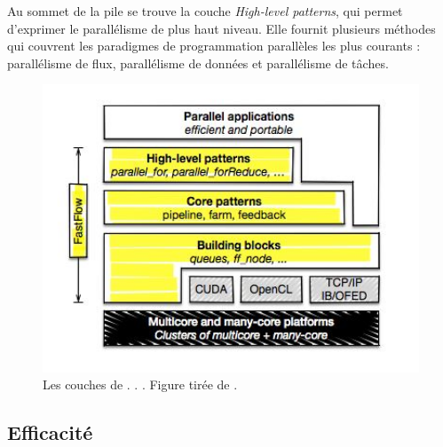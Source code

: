 Au sommet de la pile se trouve la couche \emph{High-level patterns}, qui permet d'exprimer le parall\'elisme de plus haut niveau. Elle fournit plusieurs m\'ethodes qui couvrent les paradigmes de programmation parall\`eles les plus courants : parall\'elisme de flux, parall\'elisme de donn\'ees et  parall\'elisme de t\^aches. 

\begin{figure}[ht]
\centering
     \includegraphics[width=1.0\textwidth]{Figures/FastFlowLayers.jpg}
      \caption{Les couches de . . . Figure tir\'ee de \cite{Torquati15}.}
       \label{FastFlowLayers.fig}
\end{figure}

\subsection{Efficacit\'e}

